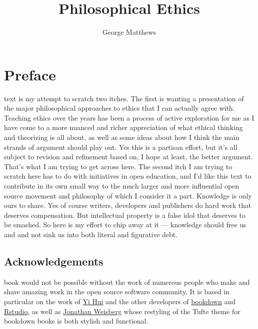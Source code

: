 \documentclass[justified]{tufte-book}
\title{Philosophical Ethics}
\author{George Matthews}
\date{}
\begin{document}
\maketitle



{
\setcounter{tocdepth}{1}
\tableofcontents
}

\hypertarget{preface}{%
\chapter*{Preface}\label{preface}}

 text is my attempt to scratch two itches. The first is wanting a presentation of the major philosophical approaches to ethics that I can actually agree with. Teaching ethics over the years has been a process of active exploration for me as I have come to a more nuanced and richer appreciation of what ethical thinking and theorizing is all about, as well as some ideas about how I think the main strands of argument should play out. Yes this is a partisan effort, but it's all subject to revision and refinement based on, I hope at least, the better argument. That's what I am trying to get across here. The second itch I am trying to scratch here has to do with initiatives in open education, and I'd like this text to contribute in its own small way to the much larger and more influential open source movement and philosophy of which I consider it a part. Knowledge is only ours to share. Yes of course writers, developers and publishers do hard work that deserves compensation. But intellectual property is a false idol that deserves to be smashed. So here is my effort to chip away at it --- knowledge should free us and and not sink us into both literal and figurative debt.

\hypertarget{acknowledgements}{%
\section*{Acknowledgements}\label{acknowledgements}}

 book would not be possible without the work of numerous people who make and share amazing work in the open source software community. It is based in particular on the work of \href{https://github.com/yihui}{Yi Hui} and the other developers of \href{https://github.com/rstudio/bookdown}{bookdown} and \href{https://rstudio.com/products/rstudio/}{Rstudio}, as well as \href{https://github.com/jweisber}{Jonathan Weisberg} whose restyling of the Tufte theme for bookdown books is both stylish and functional.
\end{document}

